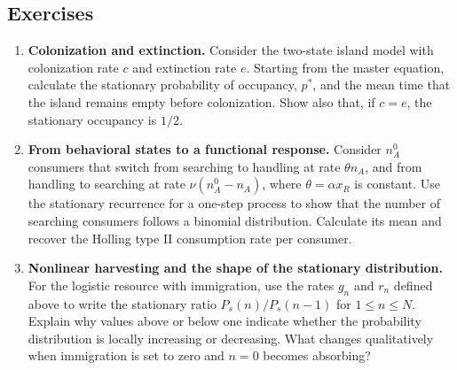 \subsection{Exercises}
\begin{enumerate}
\item \textbf{Colonization and extinction.} Consider the two-state island model with colonization rate $c$ and extinction rate $e$. Starting from the master equation, calculate the stationary probability of occupancy, $p^*$, and the mean time that the island remains empty before colonization. Show also that, if $c=e$, the stationary occupancy is $1/2$.

\item \textbf{From behavioral states to a functional response.} Consider $n_A^0$ consumers that switch from searching to handling at rate $\theta n_A$, and from handling to searching at rate $\nu(n_A^0-n_A)$, where $\theta=\alpha x_R$ is constant. Use the stationary recurrence for a one-step process to show that the number of searching consumers follows a binomial distribution. Calculate its mean and recover the Holling type II consumption rate per consumer.

\item \textbf{Nonlinear harvesting and the shape of the stationary distribution.} For the logistic resource with immigration, use the rates $g_n$ and $r_n$ defined above to write the stationary ratio $P_s(n)/P_s(n-1)$ for $1\leq n\leq N$. Explain why values above or below one indicate whether the probability distribution is locally increasing or decreasing. What changes qualitatively when immigration is set to zero and $n=0$ becomes absorbing?
\end{enumerate}
